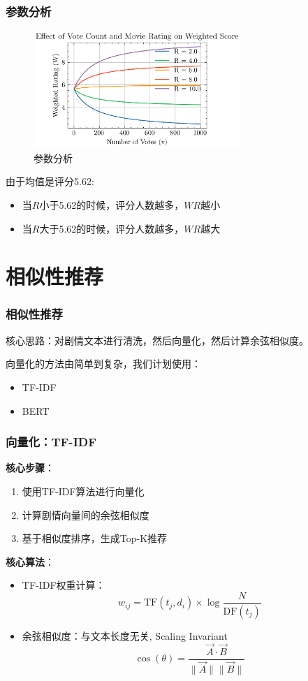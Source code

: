 \documentclass{beamer}
\begin{document}
\begin{frame}
    \frametitle{参数分析}

    \begin{figure}
        \centering
        \includegraphics[width=0.7\textwidth]{weighted_rating.png}
        \caption{参数分析}
    \end{figure}

    由于均值是评分5.62:
    \begin{itemize}
        \item 当$R$小于5.62的时候，评分人数越多，$WR$越小
        \item 当$R$大于5.62的时候，评分人数越多，$WR$越大
    \end{itemize}

\end{frame}

\section{相似性推荐}

\begin{frame}
    \frametitle{相似性推荐}
    核心思路：对剧情文本进行清洗，然后向量化，然后计算余弦相似度。

    \vspace{0.5cm}
    向量化的方法由简单到复杂，我们计划使用：
    \begin{itemize}
        \item TF-IDF
        \item BERT
    \end{itemize}
\end{frame}

\begin{frame}
    \frametitle{向量化：TF-IDF}
    \textbf{核心步骤}：
    \begin{enumerate}
        \item 使用TF-IDF算法进行向量化
        \item 计算剧情向量间的余弦相似度
        \item 基于相似度排序，生成Top-K推荐
    \end{enumerate}

    \textbf{核心算法}：
    \begin{itemize}
        \item TF-IDF权重计算：
              \[ w_{ij} = \mathrm{TF}(t_j,d_i) \times \log\frac{N}{\mathrm{DF}(t_j)} \]
        \item 余弦相似度：与文本长度无关, Scaling Invariant
              \[ \cos(\theta) = \frac{\vec{A} \cdot \vec{B}}{\|\vec{A}\| \|\vec{B}\|} \]
    \end{itemize}
\end{frame}
\end{document}
